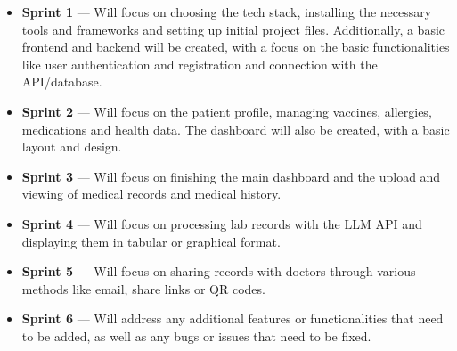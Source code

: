 \begin{itemize}
    \item \textbf{Sprint 1} --- Will focus on choosing the tech stack, installing the necessary tools and frameworks and setting up initial project files. Additionally, a basic frontend and backend will be created, with a focus on the basic functionalities like user authentication and registration and connection with the API/database.
    \item \textbf{Sprint 2} --- Will focus on the patient profile, managing vaccines, allergies, medications and health data. The dashboard will also be created, with a basic layout and design.
    \item \textbf{Sprint 3} --- Will focus on finishing the main dashboard and the upload and viewing of medical records and medical history.
    \item \textbf{Sprint 4} --- Will focus on processing lab records with the LLM API and displaying them in tabular or graphical format.
    \item \textbf{Sprint 5} --- Will focus on sharing records with doctors through various methods like email, share links or QR codes.
    \item \textbf{Sprint 6} --- Will address any additional features or functionalities that need to be added, as well as any bugs or issues that need to be fixed.
\end{itemize}
